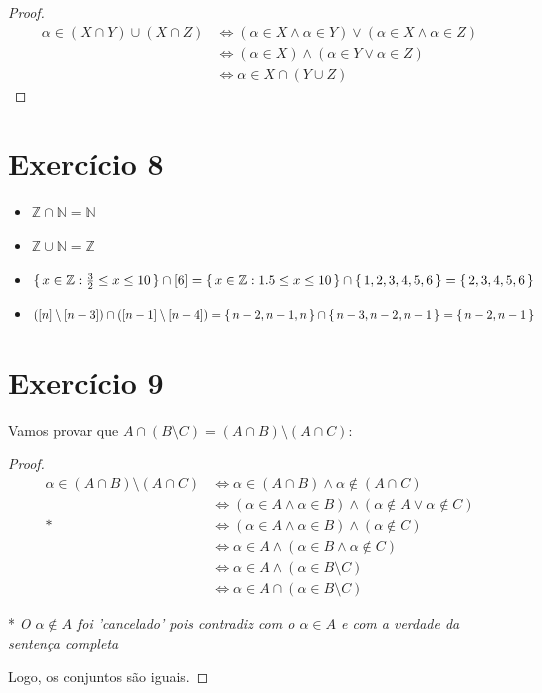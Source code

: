 \documentclass{article}
\newcommand{\Z}{\mathbb{Z}}
\newcommand{\N}{\mathbb{N}}
\begin{document}
\begin{proof}
\begin{align*}
    \alpha \in (X \cap Y) \cup (X \cap Z) &\iff (\alpha \in X \land \alpha \in Y) \lor (\alpha \in X \land \alpha \in Z) \\
    &\iff (\alpha \in X) \land (\alpha \in Y \lor \alpha \in Z) \\
    &\iff \alpha \in X \cap (Y \cup Z)
\end{align*}
\end{proof}

\section*{Exercício 8}

\begin{itemize}
    \item $\Z \cap \N = \N$
    \item $\Z \cup \N = \Z$
    \item $\set{x \in \Z : \frac{3}{2} \leq x \leq 10} \cap [6] = \set{x \in \Z : 1.5 \leq x \leq 10} \cap \set{1,2,3,4,5,6} = \set{ 2, 3, 4, 5, 6 }$
    \item $([n] \setminus [n - 3]) \cap ([n-1] \setminus [n - 4]) = \set{n-2, n-1, n} \cap \set{n-3, n-2, n-1} = \set{n-2, n-1}$
\end{itemize}

\section*{Exercício 9}

Vamos provar que $A \cap (B \setminus C) = (A \cap B) \setminus (A \cap C)$:

\medskip

\begin{proof}
\begin{align*}
    \alpha \in (A \cap B) \setminus (A \cap C) &\iff \alpha \in (A \cap B) \land \alpha \notin (A \cap C) \\
    &\iff (\alpha \in A \land \alpha \in B) \land (\alpha \notin A \lor \alpha \notin C) \\
    *&\iff (\alpha \in A \land \alpha \in B) \land (\alpha \notin C) \\
    &\iff \alpha \in A \land (\alpha \in B \land \alpha \notin C) \\
    &\iff \alpha \in A \land (\alpha \in B \setminus C) \\
    &\iff \alpha \in A \cap (\alpha \in B \setminus C)
\end{align*}

* \textit{O $\alpha \notin A$ foi 'cancelado' pois contradiz com o $\alpha \in A$ e com a verdade da sentença completa}

Logo, os conjuntos são iguais.
\end{proof}
\end{document}
